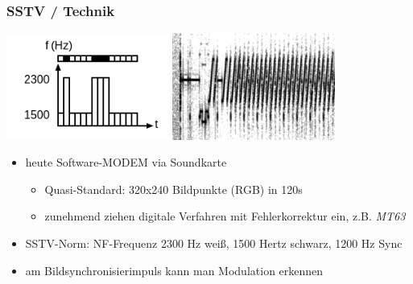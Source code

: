 \begin{frame}
    \frametitle{SSTV / Technik}

    \begin{center}
        \includegraphics[width=0.4\textwidth]{e16/Sstv_frequences.png}
        \includegraphics[width=0.4\textwidth]{e16/SSTV_signal.jpg}
        \tiny \hyperlink{refs}{\cite{wc}}
    \end{center}

    \begin{itemize}%
        \item heute Software-MODEM via Soundkarte
        \begin{itemize}
            \item Quasi-Standard: 320x240 Bildpunkte (RGB) in 120s
            \item zunehmend ziehen digitale Verfahren mit Fehlerkorrektur ein,
                  z.B. \emph{MT63}\hyperlink{refs}{\cite{wp}}
        \end{itemize}
        \item SSTV-Norm: NF-Frequenz 2300 Hz weiß, 1500 Hertz schwarz, 1200 Hz Sync
        \item am Bildsynchronisierimpuls kann man Modulation erkennen
    \end{itemize}

\end{frame}

